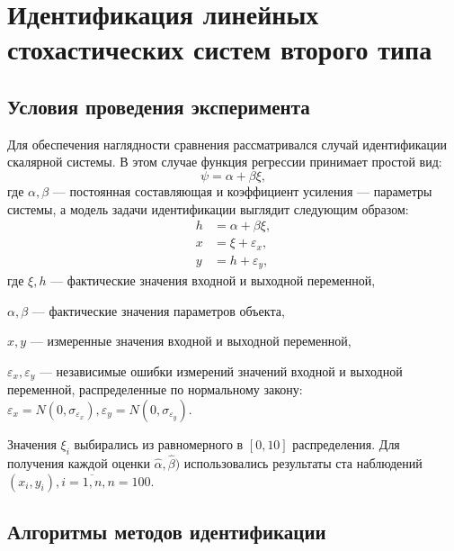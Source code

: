 \chapter[Идентификация линейных стохастических систем второго типа]{%
  Идентификация линейных стохастических систем второго типа
}

\section{Условия проведения эксперимента}

Для обеспечения наглядности сравнения рассматривался случай идентификации скалярной системы.
В этом случае функция регрессии принимает простой вид:
\begin{equation}
  \psi = \alpha + \beta \xi,
  \label{eq:fun_linear_scalar}
\end{equation}
где \( \alpha, \beta \) --- постоянная составляющая и коэффициент усиления ---
параметры системы, а модель задачи идентификации выглядит следующим образом:
\begin{equation}
  \label{eq:model_linear_scalar}
  \begin{aligned}
  h &= \alpha + \beta \xi, \\
  x &= \xi + \varepsilon_x, \\
  y &= h + \varepsilon_y,
  \end{aligned}
\end{equation}
где \( \xi, h \) --- фактические значения входной и выходной переменной, \par
\( \alpha, \beta \) --- фактические значения параметров объекта, \par
\( x, y \) --- измеренные значения входной и выходной переменной, \par
\( \varepsilon_x, \varepsilon_y \) --- независимые ошибки измерений значений входной и
выходной переменной, распределенные по нормальному закону:
\(
\varepsilon_x = N(0, \sigma_{\varepsilon_x}),
\varepsilon_y = N(0, \sigma_{\varepsilon_y})
\).

Значения \( \xi_i \) выбирались из равномерного в \( [0, 10] \) распределения.
Для получения каждой оценки \( \hat{\alpha}, \hat{\beta} ) \) использовались результаты
ста наблюдений \( ( x_i, y_i ), i = \overline{1, n}, n = 100 \).


\section{Алгоритмы методов идентификации}

